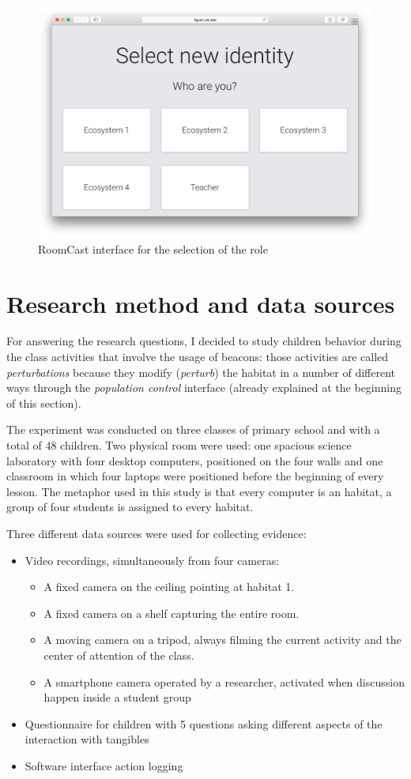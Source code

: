 \begin{figure}
\centering
\includegraphics[width=4.5in]{images/room-cast-habitat-selection.png}
\caption{RoomCast interface for the selection of the role}
\label{fig:roomcast_role}
\end{figure}

\section{Research method and data sources}
For answering the research questions, I decided to study children behavior during the class activities that involve the usage of beacons: those activities are called \textit{perturbations} because they modify (\textit{perturb}) the habitat in a number of different ways through the \textit{population control} interface (already explained at the beginning of this section).

The experiment was conducted on three classes of primary school and with a total of 48 children. Two physical room were used: one spacious science laboratory with four desktop computers, positioned on the four walls and one classroom in which four laptops were positioned before the beginning of every lesson. The metaphor used in this study is that every computer is an habitat, a group of four students is assigned to every habitat.

Three different data sources were used for collecting evidence:
\begin{itemize}
    \item Video recordings, simultaneously from four cameras:
    \begin{itemize}
        \item A fixed camera on the ceiling pointing at habitat 1.
        \item A fixed camera on a shelf capturing the entire room.
        \item A moving camera on a tripod, always filming the current activity and the center of attention of the class.
        \item A smartphone camera operated by a researcher, activated when discussion happen inside a student group
    \end{itemize}
    \item Questionnaire for children with 5 questions asking different aspects of the interaction with tangibles
    \item Software interface action logging
\end{itemize}

